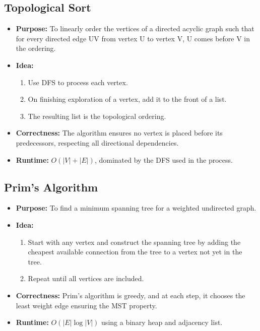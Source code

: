\documentclass[landscape,7pt]{extarticle}
\begin{document}
\begin{multicols*}{3}
\subsection*{Topological Sort}

\begin{itemize}
    \item \textbf{Purpose:} To linearly order the vertices of a directed acyclic graph such that for every directed edge UV from vertex U to vertex V, U comes before V in the ordering.
    \item \textbf{Idea:}
    \begin{enumerate}
        \item Use DFS to process each vertex.
        \item On finishing exploration of a vertex, add it to the front of a list.
        \item The resulting list is the topological ordering.
    \end{enumerate}
    \item \textbf{Correctness:} The algorithm ensures no vertex is placed before its predecessors, respecting all directional dependencies.
    \item \textbf{Runtime:} $O(|V| + |E|)$, dominated by the DFS used in the process.
\end{itemize}

\subsection*{Prim's Algorithm}

\begin{itemize}
    \item \textbf{Purpose:} To find a minimum spanning tree for a weighted undirected graph.
    \item \textbf{Idea:}
    \begin{enumerate}
        \item Start with any vertex and construct the spanning tree by adding the cheapest available connection from the tree to a vertex not yet in the tree.
        \item Repeat until all vertices are included.
    \end{enumerate}
    \item \textbf{Correctness:} Prim's algorithm is greedy, and at each step, it chooses the least weight edge ensuring the MST property.
    \item \textbf{Runtime:} $O(|E| \log |V|)$ using a binary heap and adjacency list.
\end{itemize}


\end{multicols*}
\end{document}
